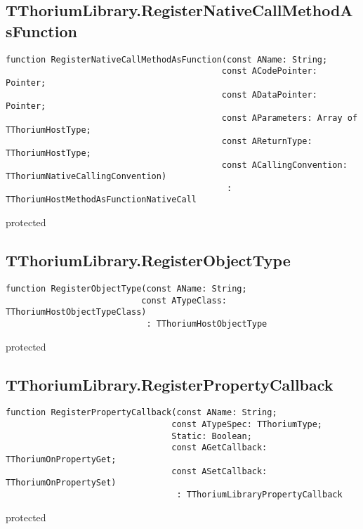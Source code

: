 \subsection{TThoriumLibrary.RegisterNativeCallMethodAsFunction}
\label{thoriumcore:thorium:tthoriumlibrary:registernativecallmethodasfunction}
\begin{FPCList}
\Synopsis
\Declaration 

\begin{verbatim}
function RegisterNativeCallMethodAsFunction(const AName: String;
                                           const ACodePointer: Pointer;
                                           const ADataPointer: Pointer;
                                           const AParameters: Array of TThoriumHostType;
                                           const AReturnType: TThoriumHostType;
                                           const ACallingConvention: TThoriumNativeCallingConvention)
                                            : TThoriumHostMethodAsFunctionNativeCall
\end{verbatim}
\Visibility
protected
\Description
\Errors
\end{FPCList}
\subsection{TThoriumLibrary.RegisterObjectType}
\label{thoriumcore:thorium:tthoriumlibrary:registerobjecttype}
\begin{FPCList}
\Synopsis
\Declaration 

\begin{verbatim}
function RegisterObjectType(const AName: String;
                           const ATypeClass: TThoriumHostObjectTypeClass)
                            : TThoriumHostObjectType
\end{verbatim}
\Visibility
protected
\Description
\Errors
\end{FPCList}
\subsection{TThoriumLibrary.RegisterPropertyCallback}
\label{thoriumcore:thorium:tthoriumlibrary:registerpropertycallback}
\begin{FPCList}
\Synopsis
\Declaration 

\begin{verbatim}
function RegisterPropertyCallback(const AName: String;
                                 const ATypeSpec: TThoriumType;
                                 Static: Boolean;
                                 const AGetCallback: TThoriumOnPropertyGet;
                                 const ASetCallback: TThoriumOnPropertySet)
                                  : TThoriumLibraryPropertyCallback
\end{verbatim}
\Visibility
protected
\Description
\Errors
\end{FPCList}
